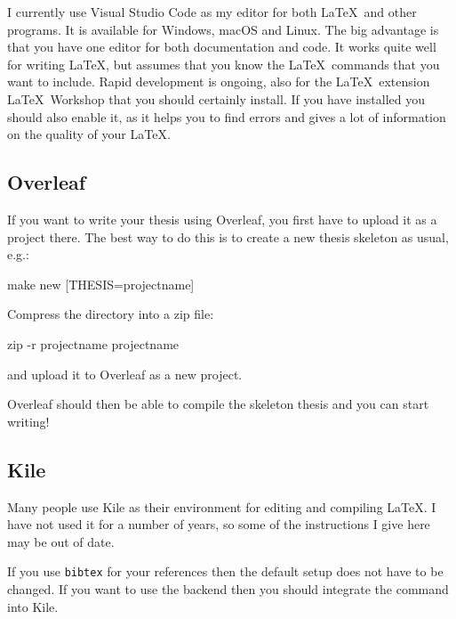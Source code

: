 I currently use Visual Studio Code as my editor for both \LaTeX\ and other programs.
It is available for Windows, macOS and Linux.
The big advantage is that you have one editor for both documentation and code.
It works quite well for writing \LaTeX,
but assumes that you know the \LaTeX\ commands that you want to include.
Rapid development is ongoing,
also for the \LaTeX\ extension \textsf{\LaTeX\ Workshop} that you should certainly install.
If you have  installed you should also enable it,
as it helps you to find errors 
and gives a lot of information on the quality of your \LaTeX.


\subsection{Overleaf}%
\label{sec:app:overleaf}

If you want to write your thesis using Overleaf,
you first have to upload it as a project there.
The best way to do this is to create a new thesis skeleton as usual, e.g.:
\begin{bashlisting}
make new [THESIS=projectname]
\end{bashlisting}
\noindent Compress the directory into a zip file:
\begin{bashlisting}
  zip -r projectname projectname
\end{bashlisting}
\noindent and upload it to Overleaf as a new project.

Overleaf should then be able to compile the skeleton thesis and you can start writing!


\subsection{Kile}%
\label{sec:app:kubuntu:kile}

Many people use Kile as their environment for editing and compiling \LaTeX. 
I have not used it for a number of years,
so some of the instructions I give here may be out of date.

If you use \texttt{bibtex} for your references then the default
setup does not have to be changed. If you want to use the
 backend then you should integrate the
command into Kile.

